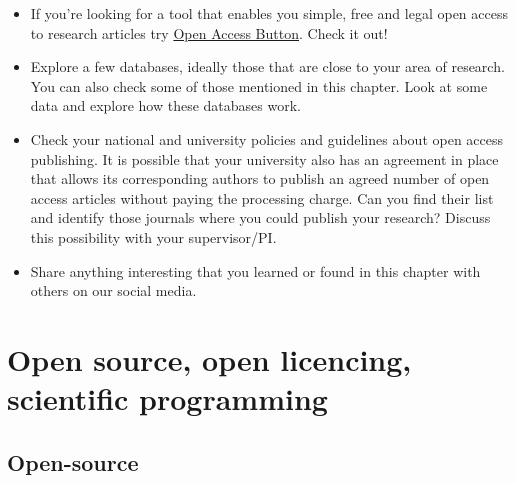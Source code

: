 \documentclass[
]{book}
\begin{document}
\begin{itemize}
\item
  If you're looking for a tool that enables you simple, free and legal open access to research articles try \href{https://openaccessbutton.org/}{Open Access Button}. Check it out!
\item
  Explore a few databases, ideally those that are close to your area of research. You can also check some of those mentioned in this chapter. Look at some data and explore how these databases work.
\item
  Check your national and university policies and guidelines about open access publishing. It is possible that your university also has an agreement in place that allows its corresponding authors to publish an agreed number of open access articles without paying the processing charge. Can you find their list and identify those journals where you could publish your research? Discuss this possibility with your supervisor/PI.
\item
  Share anything interesting that you learned or found in this chapter with others on our social media.
\end{itemize}

\hypertarget{open-source-open-licencing-scientific-programming}{%
\chapter{Open source, open licencing, scientific programming}\label{open-source-open-licencing-scientific-programming}}

\hypertarget{open-source}{%
\section{Open-source}\label{open-source}}
\end{document}
